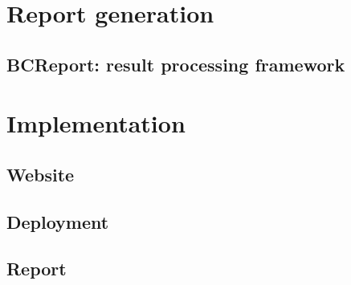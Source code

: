 \section{Report generation}

\subsection{BCReport: result processing framework}

\section{Implementation}

\subsection{Website}

\subsection{Deployment}

\subsection{Report}
